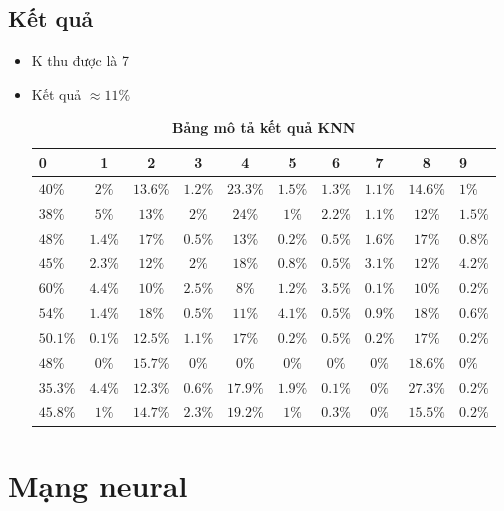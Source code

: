 \documentclass[a4paper,12pt]{report}
\begin{document}
\subsection{Kết quả}
\begin{itemize}
\item K thu được là 7
\item Kết quả $\approx 11\% $
\begin{center}
\begin{longtable}{lccccccccl}
\caption{\textbf{Bảng mô tả kết quả KNN}}
\endfirsthead
\endhead
\hline
0       &    1   &   2    &     3    &    4    &    5    &    6    &     7   &    8    &    9  \\
\hline
$40\%$  & $2\%$   & $13.6\%$ & $1.2\%$   & $23.3\%$ & $1.5\%$  & $1.3\%$  & $1.1\%$  & $14.6\%$ & $1\%$\\
\hline
$38\%$  & $5\%$   & $13\%$ & $2\%$   & $24\%$ & $1\%$  & $2.2\%$  & $1.1\%$  & $12\%$ & $1.5\%$\\
\hline
$48\%$  & $1.4\%$   & $17\%$ & $0.5\%$   & $13\%$ & $0.2\%$  & $0.5\%$  & $1.6\%$  & $17\%$ & $0.8\%$\\
\hline
$45\%$  & $2.3\%$   & $12\%$ & $2\%$   & $18\%$ & $0.8\%$  & $0.5\%$  & $3.1\%$  & $12\%$ & $4.2\%$\\
\hline
$60\%$  & $4.4\%$   & $10\%$ & $2.5\%$   & $8\%$ & $1.2\%$  & $3.5\%$  & $0.1\%$  & $10\%$ & $0.2\%$\\
\hline
$54\%$  & $1.4\%$   & $18\%$ & $0.5\%$   & $11\%$ & $4.1\%$  & $0.5\%$  & $0.9\%$  & $18\%$ & $0.6\%$\\
\hline
$50.1\%$  & $0.1\%$   & $12.5\%$ & $1.1\%$   & $17\%$ & $0.2\%$  & $0.5\%$  & $0.2\%$  & $17\%$ & $0.2\%$\\
\hline
$48\%$  & $0\%$   & $15.7\%$ & $0\%$   & $0\%$ & $0\%$  & $0\%$  & $0\%$  & $18.6\%$ & $0\%$\\
\hline
$35.3\%$  & $4.4\%$   & $12.3\%$ & $0.6\%$   & $17.9\%$ & $1.9\%$  & $0.1\%$  & $0\%$  & $27.3\%$ & $0.2\%$\\
\hline
$45.8\%$  & $1\%$   & $14.7\%$ & $2.3\%$   & $19.2\%$ & $1\%$  & $0.3\%$  & $0\%$  & $15.5\%$ & $0.2\%$\\
\hline
\end{longtable} 
\end{center}
\end{itemize}
\section{Mạng neural}
\end{document}
